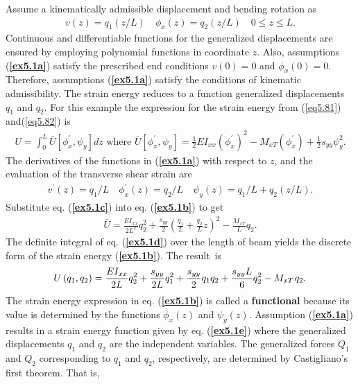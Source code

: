 \documentclass{AeroStructure-ERJohnson}
\begin{document}
\begin{example}
\noindent Assume a kinematically admissible displacement and bending rotation as
\begin{align}\label{ex5.1a}
v(z)=q_{1}(z / L) \quad \phi_{x}(z)=q_{2}(z / L) \quad 0 \leq z \leq L.
\end{align}
Continuous and differentiable functions for the generalized displacements are ensured by employing polynomial functions in coordinate $z$. Also, assumptions ({\bf\ref{ex5.1a}}) satisfy the prescribed end conditions $v(0)=0$ and $\phi_{x}(0)=0$. Therefore, assumptions ({\bf\ref{ex5.1a}}) satisfy the conditions of kinematic admissibility. The strain energy reduces to a function generalized displacements $q_1$ and $q_2$. For this example the expression for the strain energy from (\ref{eq5.81}) and\break (\ref{eq5.82}) is
\begin{align}\label{ex5.1b}
U=\int_{0}^{L} \bar{U}\left[\phi_{x}^{\prime}, \psi_{y}\right] d z\mbox{ where }\bar{U}\left[\phi_{x}^{\prime}, \psi_{y}\right]=\frac{1}{2} E I_{x x}\left(\phi_{x}^{\prime}\right)^{2}-M_{x T}\left(\phi_{x}^{\prime}\right)+\frac{1}{2} s_{y y} \psi_{y}^{2}.
\end{align}
The derivatives of the functions in ({\bf\ref{ex5.1a}}) with respect to $z$, and the evaluation of the transverse shear strain are
\begin{align}\label{ex5.1c}
v^{\prime}(z)=q_{1} / L \quad \phi_{x}^{\prime}(z)=q_{2} / L \quad \psi_{y}(z)=q_{1} / L+q_{2}(z / L).
\end{align}
Substitute eq. ({\bf\ref{ex5.1c}}) into eq. ({\bf\ref{ex5.1b}}) to get
\begin{align}\label{ex5.1d}
\bar{U}=\frac{E I_{x x}}{2 L^{2}} q_{2}^{2}+\frac{s_{y y}}{2}\left(\frac{q_{1}}{L}+\frac{q_{2}}{L} z\right)^{2}-\frac{M_{x T}}{L} q_{2}.
\end{align}
The definite integral of eq. ({\bf\ref{ex5.1d}}) over the length of beam yields the discrete form of the strain energy ({\bf\ref{ex5.1b}}). The result~is
\begin{align}\label{ex5.1e}
U\left(q_{1}, q_{2}\right)=\frac{E I_{x x}}{2 L} q_{2}^{2}+\frac{s_{y y}}{2 L} q_{1}^{2}+\frac{s_{y y}}{2} q_{1} q_{2}+\frac{s_{y y} L}{6} q_{2}^{2}-M_{x T}\hspace*{1pt}q_{2}.
\end{align}
The strain energy expression in eq. ({\bf\ref{ex5.1b}}) is called a \textbf{functional} because its value is determined by the functions $\phi_{x}(z)$ and $\psi_{y}(z)$. Assumption ({\bf\ref{ex5.1a}}) results in a strain energy function given by eq. ({\bf\ref{ex5.1e}}) where the generalized displacements $q_{1}$ and $q_{2}$ are the independent variables. The generalized forces $Q_{1}$ and $Q_{2}$ corresponding to $q_{1}$ and $q_{2}$, respectively, are determined by Castigliano's first theorem. That is,

\end{example}
\end{document}

